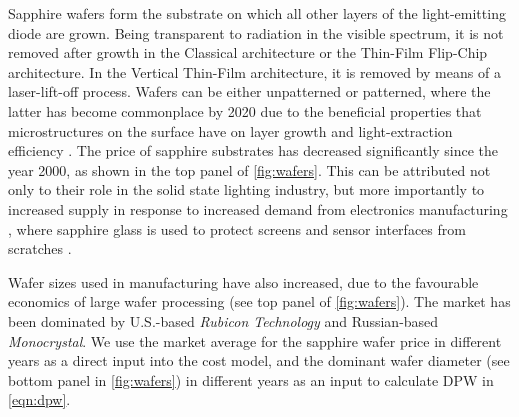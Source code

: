 \documentclass[parskip=full]{article}
\begin{document}
Sapphire wafers form the substrate on which all other layers of the light-emitting diode are grown. Being transparent to radiation in the visible spectrum, it is not removed after growth in the Classical architecture or the Thin-Film Flip-Chip architecture. In the Vertical Thin-Film architecture, it is removed by means of a laser-lift-off process. Wafers can be either unpatterned or patterned, where the latter has become commonplace by 2020 due to the beneficial properties that microstructures on the surface have on layer growth \cite{wuu2009defect} and light-extraction efficiency \cite{lee2006enhancing}. The price of sapphire substrates has decreased significantly since the year 2000, as shown in the top panel of \cref{fig:wafers}. This can be attributed not only to their role in the solid state lighting industry, but more importantly to increased supply in response to increased demand from electronics manufacturing \cite{yole2015sapphire}, where sapphire glass is used to protect screens and sensor interfaces from scratches \cite{khattak2016world}.

Wafer sizes used in manufacturing have also increased, due to the favourable economics of large wafer processing (see top panel of \cref{fig:wafers}). The market has been dominated by U.S.-based \textit{Rubicon Technology} and Russian-based \textit{Monocrystal}. We use the market average for the sapphire wafer price in different years as a direct input into the cost model, and the dominant wafer diameter (see bottom panel in \cref{fig:wafers}) in different years as an input to calculate DPW in \cref{eqn:dpw}.
\end{document}
